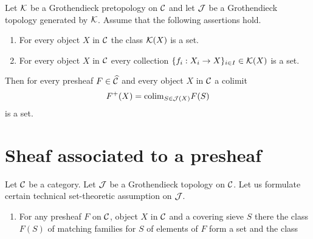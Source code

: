 \begin{proposition}
Let ${\mathcal K}$ be a Grothendieck pretopology on ${\mathcal C}$ and let ${\mathcal J}$ be a Grothendieck topology generated by ${\mathcal K}$. Assume that the following assertions hold.
\begin{enumerate}[label=\emph{\textbf{(\arabic*)}}, leftmargin=1.5em]
\item For every object $X$ in ${\mathcal C}$ the class ${\mathcal K}(X)$ is a set.
\item For every object $X$ in ${\mathcal C}$ every collection $\{f_i:X_i\rightarrow X\}_{i\in I}\in {\mathcal K}(X)$ is a set.
\end{enumerate}
Then for every presheaf $F\in \widehat{{\mathcal C}}$ and every object $X$ in ${\mathcal C}$ a colimit 
$$F^+(X) = \mathrm{colim}_{S\in {\mathcal J}(X)}F(S)$$
is a set.
\end{proposition}



\section{Sheaf associated to a presheaf}
\noindent
Let ${\mathcal C}$ be a category. 
\noindent
Let ${\mathcal J}$ be a Grothendieck topology on ${\mathcal C}$. Let us formulate certain technical set-theoretic assumption on ${\mathcal J}$.
\begin{enumerate}[label=\textbf{($\star$)}, leftmargin=1.5em]
\item For any presheaf $F$ on ${\mathcal C}$, object $X$ in ${\mathcal C}$ and a covering sieve $S$ there the class $F(S)$ of matching families for $S$ of elements of $F$ form a set and the class 
\end{enumerate}

